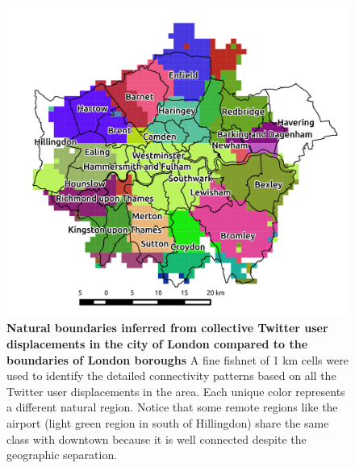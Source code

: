 \documentclass[10pt,letterpaper]{article}
\begin{document}
\begin{figure}[ht]
\includegraphics[width=0.8\linewidth]{./figure/PNG/S7_london}
\caption{{\bf Natural boundaries inferred from collective Twitter user displacements in the city of London compared to the boundaries of London boroughs}  A fine fishnet of 1 km cells were used to identify the detailed connectivity patterns based on all the Twitter user displacements in the area.  Each unique color represents a different natural region. Notice that some remote regions like the airport (light green region in south of Hillingdon) share the same class with downtown because it is well connected despite the geographic separation.}
\label{S7_Fig}
\end{figure}
\end{document}
